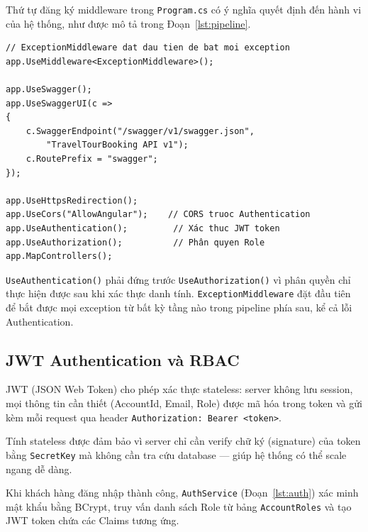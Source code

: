 Thứ tự đăng ký middleware trong \texttt{Program.cs} có ý nghĩa
quyết định đến hành vi của hệ thống, như được mô tả trong
Đoạn~\ref{lst:pipeline}.

\begin{lstlisting}[style=csharp,
  caption={Middleware Pipeline trong Program.cs},
  label={lst:pipeline}]
// ExceptionMiddleware dat dau tien de bat moi exception
app.UseMiddleware<ExceptionMiddleware>();

app.UseSwagger();
app.UseSwaggerUI(c =>
{
    c.SwaggerEndpoint("/swagger/v1/swagger.json",
        "TravelTourBooking API v1");
    c.RoutePrefix = "swagger";
});

app.UseHttpsRedirection();
app.UseCors("AllowAngular");    // CORS truoc Authentication
app.UseAuthentication();         // Xác thuc JWT token
app.UseAuthorization();          // Phân quyen Role
app.MapControllers();
\end{lstlisting}

\texttt{UseAuthentication()} phải đứng trước
\texttt{UseAuthorization()} vì phân quyền chỉ thực hiện được
sau khi xác thực danh tính. \texttt{ExceptionMiddleware} đặt
đầu tiên để bắt được mọi exception từ bất kỳ tầng nào trong
pipeline phía sau, kể cả lỗi Authentication.

\subsection{JWT Authentication và RBAC}\label{sub3.2.3}

JWT (JSON Web Token) cho phép xác thực stateless: server không
lưu session, mọi thông tin cần thiết (AccountId, Email, Role)
được mã hóa trong token và gửi kèm mỗi request qua header
\texttt{Authorization: Bearer <token>}.

Tính stateless được đảm bảo vì server chỉ cần verify chữ ký
(signature) của token bằng \texttt{SecretKey} mà không cần
tra cứu database — giúp hệ thống có thể scale ngang dễ dàng.
\QEDAa

Khi khách hàng đăng nhập thành công, \texttt{AuthService}
(Đoạn~\ref{lst:auth}) xác minh mật khẩu bằng BCrypt, truy
vấn danh sách Role từ bảng \texttt{AccountRoles} và tạo JWT
token chứa các Claims tương ứng.

